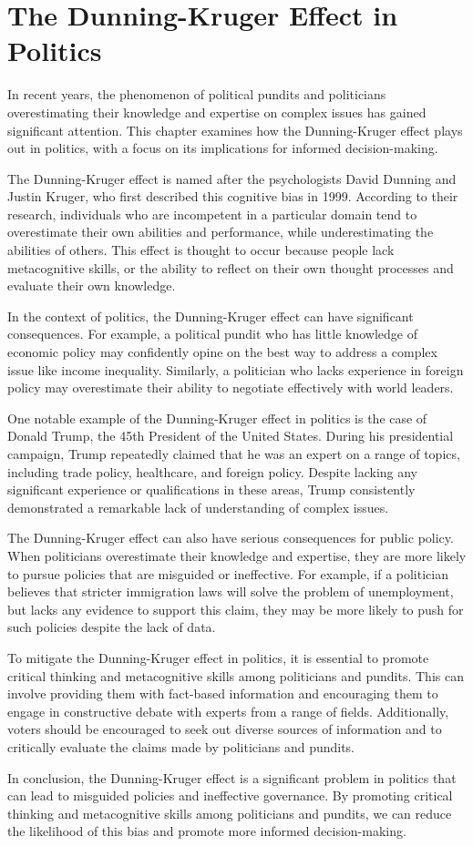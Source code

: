 \chapter{The Dunning-Kruger Effect in Politics}

In recent years, the phenomenon of political pundits and politicians overestimating their knowledge and expertise on complex issues has gained significant attention. This chapter examines how the Dunning-Kruger effect plays out in politics, with a focus on its implications for informed decision-making.

The Dunning-Kruger effect is named after the psychologists David Dunning and Justin Kruger, who first described this cognitive bias in 1999. According to their research, individuals who are incompetent in a particular domain tend to overestimate their own abilities and performance, while underestimating the abilities of others. This effect is thought to occur because people lack metacognitive skills, or the ability to reflect on their own thought processes and evaluate their own knowledge.

In the context of politics, the Dunning-Kruger effect can have significant consequences. For example, a political pundit who has little knowledge of economic policy may confidently opine on the best way to address a complex issue like income inequality. Similarly, a politician who lacks experience in foreign policy may overestimate their ability to negotiate effectively with world leaders.

One notable example of the Dunning-Kruger effect in politics is the case of Donald Trump, the 45th President of the United States. During his presidential campaign, Trump repeatedly claimed that he was an expert on a range of topics, including trade policy, healthcare, and foreign policy. Despite lacking any significant experience or qualifications in these areas, Trump consistently demonstrated a remarkable lack of understanding of complex issues.

The Dunning-Kruger effect can also have serious consequences for public policy. When politicians overestimate their knowledge and expertise, they are more likely to pursue policies that are misguided or ineffective. For example, if a politician believes that stricter immigration laws will solve the problem of unemployment, but lacks any evidence to support this claim, they may be more likely to push for such policies despite the lack of data.

To mitigate the Dunning-Kruger effect in politics, it is essential to promote critical thinking and metacognitive skills among politicians and pundits. This can involve providing them with fact-based information and encouraging them to engage in constructive debate with experts from a range of fields. Additionally, voters should be encouraged to seek out diverse sources of information and to critically evaluate the claims made by politicians and pundits.

In conclusion, the Dunning-Kruger effect is a significant problem in politics that can lead to misguided policies and ineffective governance. By promoting critical thinking and metacognitive skills among politicians and pundits, we can reduce the likelihood of this bias and promote more informed decision-making.